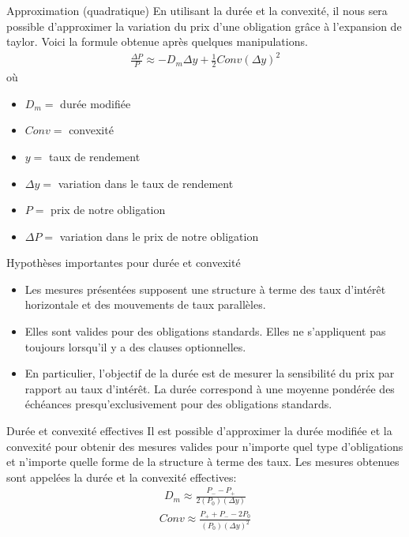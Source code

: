 \documentclass{beamer}
\begin{document}
\begin{frame}{Approximation (quadratique)}
En utilisant la durée et la convexité,  il nous sera possible d'approximer la variation du prix d'une obligation grâce à l'expansion de taylor.  Voici la formule obtenue après quelques manipulations.
\begin{align*}
\frac{\Delta P}{P} \approx -D_m \Delta y +\frac{1}{2} Conv(\Delta y)^2
\end{align*}
où 
\begin{itemize}
\item $D_m=$ durée modifiée 
\item $Conv=$ convexité
\item $y=$ taux de rendement 
\item $\Delta y=$ variation dans le taux de rendement 
\item $P=$ prix de notre obligation 
\item $\Delta P=$ variation dans le prix de notre obligation 
\end{itemize}
\end{frame}

\begin{frame}{Hypothèses importantes pour durée et convexité}
\begin{itemize}
\item Les mesures présentées supposent une structure à terme des taux d’intérêt horizontale et des mouvements de taux parallèles.
\item Elles sont valides pour des obligations standards. Elles ne s’appliquent pas toujours lorsqu’il y a des clauses optionnelles.
\item En particulier, l’objectif de la durée est de mesurer la sensibilité du prix par rapport au taux d’intérêt. La durée correspond à une moyenne pondérée des échéances presqu’exclusivement pour des obligations standards.
\end{itemize}
\end{frame}
\begin{frame}{Durée et convexité effectives}
Il est possible d’approximer la durée modifiée et la convexité pour obtenir des mesures valides pour n’importe quel type d’obligations et n’importe quelle forme de la structure à terme des taux. Les mesures obtenues sont appelées la durée et la convexité effectives:
\begin{align*}
D_m \approx \frac{P_{-}-P_{+}}{2(P_0)(\Delta y)}
\end{align*}
\begin{align*}
Conv\approx \frac{P_{+}+P_{-}-2P_0}{(P_0)(\Delta y)^2}
\end{align*}
\end{frame}
\end{document}
